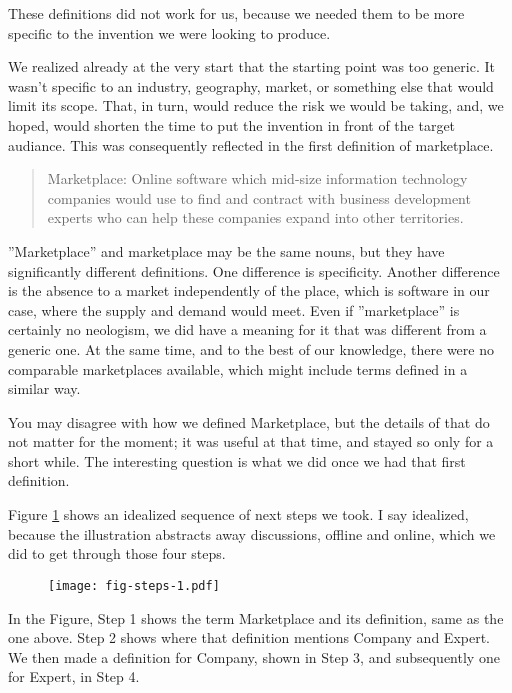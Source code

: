 \documentclass[graybox,envcountchap,sectrefs]{svmono}
\newcommand{\newterm}[1]{\begin{quote}\textsf{#1}\end{quote}}
\newcommand{\nterm}[1]{\textsf{#1}}
\begin{document}
These definitions did not work for us, because we needed them to be more specific to the invention we were looking to produce. 

We realized already at the very start that the starting point was too generic. It wasn't specific to an industry, geography, market, or something else that would limit its scope. That, in turn, would reduce the risk we would be taking, and, we hoped, would shorten the time to put the invention in front of the target audiance. This was consequently reflected in the first definition of \nterm{marketplace}.

\newterm{Marketplace: Online software which mid-size information technology companies would use to find and contract with business development experts who can help these companies expand into other territories.}

''Marketplace'' and \nterm{marketplace} may be the same nouns, but they have significantly different definitions. One  difference is specificity. Another difference is the absence to a market independently of the place, which is software in our case, where the supply and demand would meet. Even if ''marketplace'' is certainly no neologism, we did have a meaning for it that was different from a generic one. At the same time, and to the best of our knowledge, there were no comparable marketplaces available, which might include terms defined in a similar way.  

You may disagree with how we defined \nterm{Marketplace}, but the details of that do not matter for the moment; it was useful at that time, and stayed so only for a short while. The interesting question is what we did once we had that first definition. 

Figure \ref{fig-steps-1} shows an idealized sequence of next steps we took. I say idealized, because the illustration abstracts away discussions, offline and online, which we did to get through those four steps. 

\begin{figure}[p]
 \centering
 \texttt{[image: fig-steps-1.pdf]}
 \caption{}
 \label{fig-steps-1}
\end{figure}

In the Figure, Step 1 shows the term \nterm{Marketplace} and its definition, same as the one above. Step 2 shows where that definition mentions \nterm{Company} and \nterm{Expert}. We then made a definition for \nterm{Company}, shown in Step 3, and subsequently one for \nterm{Expert}, in Step 4.
\end{document}
